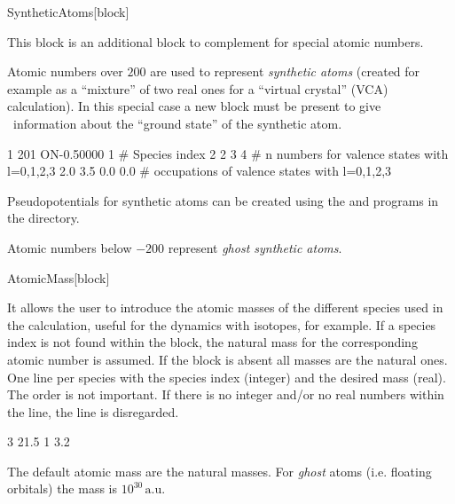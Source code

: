 \begin{fdfentry}{SyntheticAtoms}[block]

  This block is an additional block to complement
   for special atomic numbers.
  
  Atomic numbers over $200$ are used to represent \emph{synthetic atoms}
   (created for example as a ``mixture'' of two
  real ones for a ``virtual crystal'' (VCA)
  calculation). In this special case a new  block
  must be present to give \siesta\ information about the ``ground
  state'' of the synthetic atom.

  \begin{fdfexample}
        1   201 ON-0.50000
        1               # Species index
        2 2 3 4         # n numbers for valence states  with l=0,1,2,3
        2.0 3.5 0.0 0.0 # occupations of valence states with l=0,1,2,3
  \end{fdfexample}

  Pseudopotentials for synthetic atoms can be created using the
   and  programs  in the 
  directory.

  Atomic numbers below $-200$ represent \emph{ghost synthetic atoms}.
  
\end{fdfentry}

\begin{fdfentry}{AtomicMass}[block]

  It allows the user to introduce the atomic masses of the different
  species used in the calculation, useful for the dynamics with
  isotopes, for example. If a species index is not
  found within the block, the natural mass for the corresponding
  atomic number is assumed. If the block is absent all masses are the
  natural ones. One line per species with the species index (integer)
  and the desired mass (real). The order is not important. If there is
  no integer and/or no real numbers within the line, the line is
  disregarded.

  \begin{fdfexample}
        3  21.5
        1  3.2
  \end{fdfexample}

  The default atomic mass are the natural masses. For \emph{ghost}
  atoms (i.e. floating orbitals) the mass is $10^{30}\,\mathrm{a.u.}$ 

\end{fdfentry}




